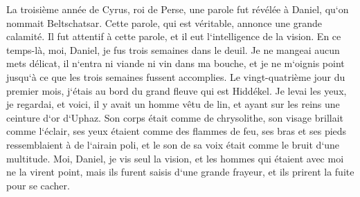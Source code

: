 \verse La troisième année de Cyrus, roi de Perse, une parole fut révélée à Daniel, qu`on nommait Beltschatsar. Cette parole, qui est véritable, annonce une grande calamité. Il fut attentif à cette parole, et il eut l`intelligence de la vision. 
\verse En ce temps-là, moi, Daniel, je fus trois semaines dans le deuil. 
\verse Je ne mangeai aucun mets délicat, il n`entra ni viande ni vin dans ma bouche, et je ne m`oignis point jusqu`à ce que les trois semaines fussent accomplies. 
\verse Le vingt-quatrième jour du premier mois, j`étais au bord du grand fleuve qui est Hiddékel. 
\verse Je levai les yeux, je regardai, et voici, il y avait un homme vêtu de lin, et ayant sur les reins une ceinture d`or d`Uphaz. 
\verse Son corps était comme de chrysolithe, son visage brillait comme l`éclair, ses yeux étaient comme des flammes de feu, ses bras et ses pieds ressemblaient à de l`airain poli, et le son de sa voix était comme le bruit d`une multitude. 
\verse Moi, Daniel, je vis seul la vision, et les hommes qui étaient avec moi ne la virent point, mais ils furent saisis d`une grande frayeur, et ils prirent la fuite pour se cacher. 
